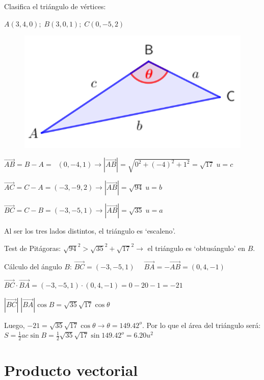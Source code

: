 \begin{ejem}
 
\begin{multicols}{2}

Clasifica el triángulo de vértices:
 
$A(3,4,0);\; B(3,0,1); \; C(0,-5,2)$

\begin{figure}[H]
	\centering
	\includegraphics[width=.35\textwidth]{imagenes/imagenes09/T09IM19.png}
\end{figure}
\end{multicols}

$\overrightarrow{AB}=B-A=\;\;(0,-4,1) \to |\overrightarrow{AB}|=\sqrt{0^2+(-4)^2+1^2}=\sqrt{17}\; u=c$

$\overrightarrow{AC}=C-A=(-3,-9,2) \to |\overrightarrow{AB}|=\sqrt{94}\; u=b$

$\overrightarrow{BC}=C-B=(-3,-5,1) \to |\overrightarrow{AB}|=\sqrt{35}\; u=a$

Al ser los tres lados distintos, el triángulo es `escaleno'.

Test de Pitágoras: $\sqrt{94}^2 > \sqrt{35}^2+\sqrt{17}^2 \to$ el triángulo es `obtusángulo' en $B$.

Cálculo del ángulo $B$: $\overrightarrow{BC}=(-3,-5,1)\; \quad \overrightarrow{BA}=-\overrightarrow{AB}=(0,4,-1)$

$\overrightarrow{BC}\cdot \overrightarrow{BA}=(-3,-5,1)\cdot (0,4,-1)=0-20-1=-21$

$|\overrightarrow{BC}|\;|\overrightarrow{BA}|\cos B=\sqrt{35} \sqrt{17} \cos \theta$

Luego, $-21=\sqrt{35} \sqrt{17} \cos \theta \longrightarrow \theta = 149.42^o$. Por lo que el área del triángulo será: $S=\frac 1 2 a c \sin B=\frac 1 2 \sqrt{35} \sqrt{17} \sin 149.42^o= 6.20 u^2$
\end{ejem}

\section{Producto vectorial}


